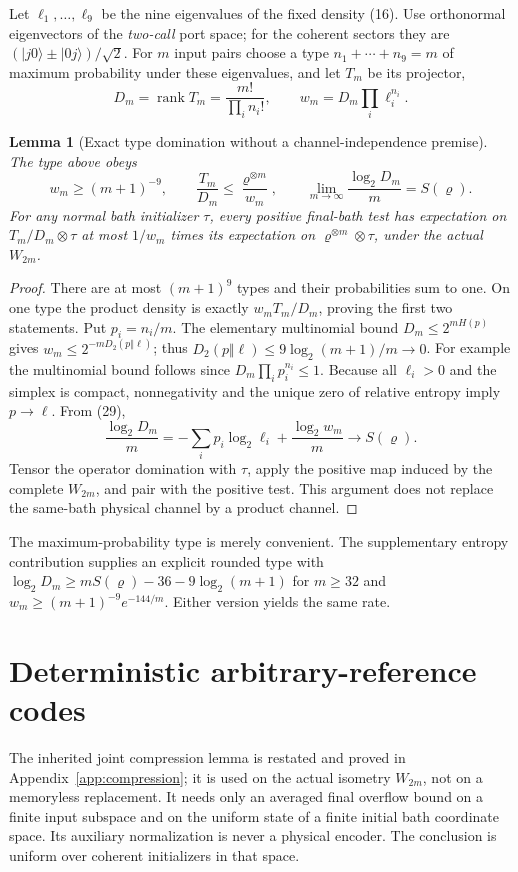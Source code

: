 \documentclass[11pt]{article}
\newtheorem{lemma}[theorem]{Lemma}
\newcommand{\rank}{\operatorname{rank}}
\begin{document}
Let $\ell_1,\ldots,\ell_9$ be the nine eigenvalues of the fixed density (16).
Use orthonormal eigenvectors of the \emph{two-call} port space; for the
coherent sectors they are $(|j0\rangle\pm|0j\rangle)/\sqrt2$.
For $m$ input pairs choose a type $n_1+\cdots+n_9=m$ of maximum probability
under these eigenvalues, and let $T_m$ be its projector,
\[
 D_m=\rank T_m=\frac{m!}{\prod_i n_i!},\qquad
 w_m=D_m\prod_i\ell_i^{n_i}.
 \tag{29}
\]

\begin{lemma}[Exact type domination without a channel-independence premise]
\label{lem:type}
The type above obeys
\[
 w_m\ge(m+1)^{-9},\qquad
 \frac{T_m}{D_m}\le\frac{\varrho^{\otimes m}}{w_m},\qquad
 \lim_{m\to\infty}\frac{\log_2D_m}{m}=S(\varrho).
 \tag{30}
\]
For any normal bath initializer $\tau$, every positive final-bath test has
expectation on $T_m/D_m\otimes\tau$ at most $1/w_m$ times its expectation
on $\varrho^{\otimes m}\otimes\tau$, under the actual $W_{2m}$.
\end{lemma}
\begin{proof}
There are at most $(m+1)^9$ types and their probabilities sum to one.
On one type the product density is exactly $w_m T_m/D_m$, proving the
first two statements. Put $p_i=n_i/m$. The elementary multinomial bound
$D_m\le2^{mH(p)}$ gives $w_m\le2^{-mD_2(p\Vert\ell)}$; thus
$D_2(p\Vert\ell)\le9\log_2(m+1)/m\to0$. For example the multinomial bound
follows since $D_m\prod_i p_i^{n_i}\le1$. Because all $\ell_i>0$ and the
simplex is compact, nonnegativity and the unique zero of relative entropy
imply $p\to\ell$. From (29),
\[
 \frac{\log_2D_m}{m}
 =-\sum_i p_i\log_2\ell_i+\frac{\log_2w_m}{m}\longrightarrow S(\varrho).
\]
Tensor the operator domination with $\tau$, apply the positive map induced
by the complete $W_{2m}$, and pair with the positive test. This argument
does not replace the same-bath physical channel by a product channel.
\end{proof}

The maximum-probability type is merely convenient. The supplementary entropy
contribution supplies an explicit rounded type with
$\log_2D_m\ge mS(\varrho)-36-9\log_2(m+1)$ for $m\ge32$ and
$w_m\ge(m+1)^{-9}e^{-144/m}$. Either version yields the same rate.

\section{Deterministic arbitrary-reference codes}

The inherited joint compression lemma is restated and proved in
Appendix~\ref{app:compression}; it is used on the actual isometry $W_{2m}$,
not on a memoryless replacement. It needs only an averaged final overflow
bound on a finite input subspace and on the uniform state of a finite initial
bath coordinate space. Its auxiliary normalization is never a physical
encoder. The conclusion is uniform over coherent initializers in that space.
\end{document}
